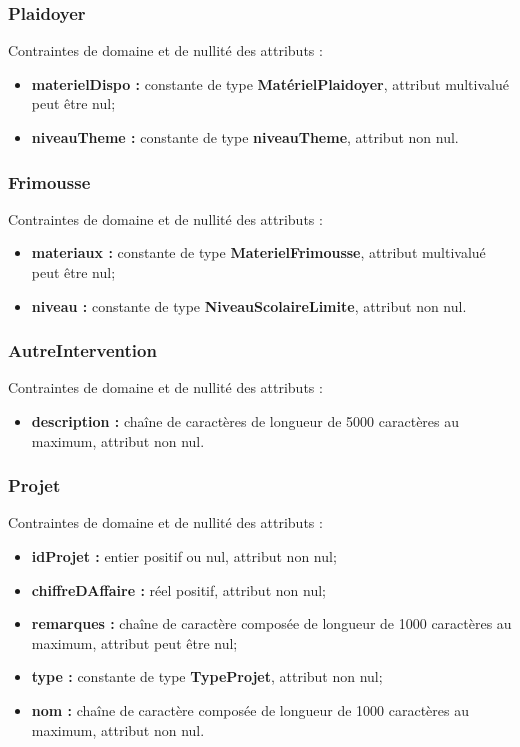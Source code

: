 \subsubsection*{Plaidoyer}
Contraintes de domaine et de nullité des attributs :
\begin{itemize}
	\item \textbf{materielDispo :} constante de type \textbf{MatérielPlaidoyer}, attribut multivalué peut être nul; 
	\item \textbf{niveauTheme :} constante de type \textbf{niveauTheme}, attribut non nul.\\
\end{itemize}

\subsubsection*{Frimousse}
Contraintes de domaine et de nullité des attributs :
\begin{itemize}
	\item \textbf{materiaux :} constante de type \textbf{MaterielFrimousse}, attribut multivalué peut être nul;
	\item \textbf{niveau :} constante de type \textbf{NiveauScolaireLimite}, attribut non nul.\\
\end{itemize}

\subsubsection*{AutreIntervention}
Contraintes de domaine et de nullité des attributs :
\begin{itemize}
\item \textbf{description :} chaîne de caractères de longueur de 5000 caractères au maximum, attribut non nul.\\
\end{itemize}

\subsubsection*{Projet}
Contraintes de domaine et de nullité des attributs :
\begin{itemize}
 	\item \textbf{idProjet :} entier positif ou nul, attribut non nul;
	\item \textbf{chiffreDAffaire :} réel positif, attribut non nul;
	\item \textbf{remarques :} chaîne de caractère composée de longueur de 1000 caractères au maximum, attribut peut être nul;
	\item \textbf{type :} constante de type \textbf{TypeProjet}, attribut non nul;
	\item \textbf{nom :} chaîne de caractère composée de longueur de 1000 caractères au maximum, attribut non nul.\\  
\end{itemize} 

